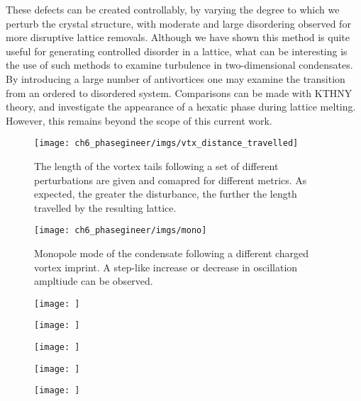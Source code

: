 These defects can be created controllably, by varying the degree to which we perturb the crystal structure, with moderate and large disordering observed for more disruptive lattice removals. Although we have shown this method is quite useful for generating controlled disorder in a lattice, what can be interesting is the use of such methods to examine turbulence in two-dimensional condensates. By introducing a large number of antivortices one may examine the transition from an ordered to disordered system. Comparisons can be made with KTHNY theory, and investigate the appearance of a hexatic phase during lattice melting. However, this remains beyond the scope of this current work.

\begin{figure}\centering
    \texttt{[image: ch6\_phasegineer/imgs/vtx\_distance\_travelled]}
    \caption{The length of the vortex tails following a set of different perturbations are given and comapred for different metrics. As expected, the greater the disturbance, the further the length travelled by the resulting lattice.}\label{fig:vtx_dist_travelled}
\end{figure}

\begin{figure}\centering
    \texttt{[image: ch6\_phasegineer/imgs/mono]}
    \caption{Monopole mode of the condensate following a different charged vortex imprint. A step-like increase or decrease in oscillation ampltiude can be observed.}\label{fig:monopoles}
\end{figure}

\begin{figure}\centering
    \texttt{[image: ]}
    \caption{}\label{}
\end{figure}

\begin{figure}\centering
    \texttt{[image: ]}
    \caption{}\label{}
\end{figure}

\begin{figure}\centering
    \texttt{[image: ]}
    \caption{}\label{}
\end{figure}

\begin{figure}\centering
    \texttt{[image: ]}
    \caption{}\label{}
\end{figure}

\begin{figure}\centering
    \texttt{[image: ]}
    \caption{}\label{}
\end{figure}
